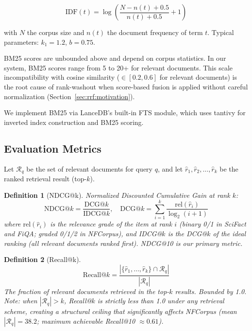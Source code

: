 \documentclass[11pt]{article}
\newtheorem{definition}{Definition}
\begin{document}
\begin{equation}
  \text{IDF}(t) = \log\!\left(\frac{N - n(t) + 0.5}{n(t) + 0.5} + 1\right)
\end{equation}

with $N$ the corpus size and $n(t)$ the document frequency of term $t$. Typical
parameters: $k_1 = 1.2$, $b = 0.75$.

BM25 scores are unbounded above and depend on corpus statistics. In our system, BM25
scores range from 5 to 20+ for relevant documents. This scale incompatibility with
cosine similarity ($\in [0.2, 0.6]$ for relevant documents) is the root cause of
rank-washout when score-based fusion is applied without careful normalization
(Section~\ref{sec:rrf:motivation}).

We implement BM25 via LanceDB's built-in FTS module, which uses tantivy for inverted
index construction and BM25 scoring.

\subsection{Evaluation Metrics}

Let $\mathcal{R}_q$ be the set of relevant documents for query $q$, and let
$\hat{r}_1, \hat{r}_2, \ldots, \hat{r}_k$ be the ranked retrieval result (top-$k$).

\begin{definition}[NDCG@k]
Normalized Discounted Cumulative Gain at rank $k$:
\begin{equation}
  \text{NDCG@}k = \frac{\text{DCG@}k}{\text{IDCG@}k}, \quad
  \text{DCG@}k = \sum_{i=1}^{k} \frac{\text{rel}(\hat{r}_i)}{\log_2(i+1)}
\end{equation}
where $\text{rel}(\hat{r}_i)$ is the relevance grade of the item at rank $i$ (binary 0/1
in SciFact and FiQA; graded 0/1/2 in NFCorpus), and IDCG@$k$ is the DCG@$k$ of the
ideal ranking (all relevant documents ranked first). NDCG@10 is our primary metric.
\end{definition}

\begin{definition}[Recall@k]
\begin{equation}
  \text{Recall@}k = \frac{|\{\hat{r}_1,\ldots,\hat{r}_k\} \cap \mathcal{R}_q|}{|\mathcal{R}_q|}
\end{equation}
The fraction of relevant documents retrieved in the top-$k$ results. Bounded by 1.0.
Note: when $|\mathcal{R}_q| > k$, Recall@$k$ is strictly less than 1.0 under any
retrieval scheme, creating a structural ceiling that significantly affects NFCorpus
(mean $|\mathcal{R}_q| = 38.2$; maximum achievable Recall@10 $\approx 0.61$).
\end{definition}
\end{document}
